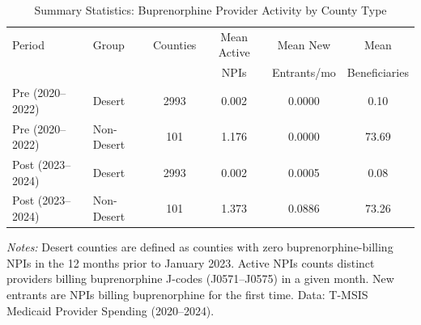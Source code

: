 \begin{table}[htbp]
\centering
\caption{Summary Statistics: Buprenorphine Provider Activity by County Type}
\label{tab:summary}
\begin{threeparttable}
\begin{tabular}{llcccc}
\hline\hline
Period & Group & Counties & Mean Active & Mean New & Mean \\
 & & & NPIs & Entrants/mo & Beneficiaries \\
\hline
Pre (2020--2022) & Desert & 2993 & 0.002 & 0.0000 & 0.10 \\
Pre (2020--2022) & Non-Desert & 101 & 1.176 & 0.0000 & 73.69 \\
\hline
Post (2023--2024) & Desert & 2993 & 0.002 & 0.0005 & 0.08 \\
Post (2023--2024) & Non-Desert & 101 & 1.373 & 0.0886 & 73.26 \\
\hline\hline
\end{tabular}
\begin{tablenotes}[flushleft]\small
\item \textit{Notes:} Desert counties are defined as counties with zero buprenorphine-billing NPIs in the 12 months prior to January 2023. Active NPIs counts distinct providers billing buprenorphine J-codes (J0571--J0575) in a given month. New entrants are NPIs billing buprenorphine for the first time. Data: T-MSIS Medicaid Provider Spending (2020--2024).
\end{tablenotes}
\end{threeparttable}
\end{table}
